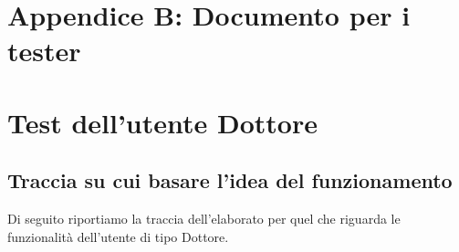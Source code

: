 \documentclass[11pt]{article}
\begin{document}
    \newpage
    \section*{Appendice B: Documento per i tester}

    \section*{Test dell'utente Dottore}

        \subsection*{Traccia su cui basare l'idea del funzionamento}
            Di seguito riportiamo la traccia dell'elaborato per quel che riguarda le funzionalità dell'utente di tipo Dottore.
\end{document}
